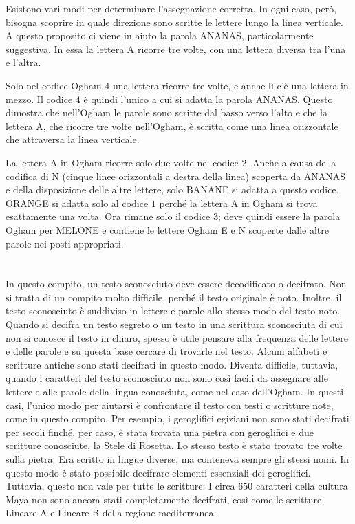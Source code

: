 {{Esistono vari modi per determinare l’assegnazione corretta. In ogni caso, però, bisogna scoprire in quale direzione sono scritte le lettere lungo la linea verticale. A questo proposito ci viene in aiuto la parola ANANAS, particolarmente suggestiva. In essa la lettera A ricorre tre volte, con una lettera diversa tra l’una e l’altra.

Solo nel codice Ogham $4$ una lettera ricorre tre volte, e anche lì c’è una lettera in mezzo. Il codice $4$ è quindi l’unico a cui si adatta la parola ANANAS. Questo dimostra che nell’Ogham le parole sono scritte dal basso verso l’alto e che la lettera A, che ricorre tre volte nell’Ogham, è scritta come una linea orizzontale che attraversa la linea verticale.

La lettera A in Ogham ricorre solo due volte nel codice $2$. Anche a causa della codifica di N (cinque linee orizzontali a destra della linea) scoperta da ANANAS e della disposizione delle altre lettere, solo BANANE si adatta a questo codice. ORANGE si adatta solo al codice $1$ perché la lettera A in Ogham si trova esattamente una volta. Ora rimane solo il codice $3$; deve quindi essere la parola Ogham per MELONE e contiene le lettere Ogham E e N scoperte dalle altre parole nei posti appropriati.



\section*{\BrochureItsInformatics}
In questo compito, un testo sconosciuto deve essere decodificato o decifrato.  Non si tratta di un compito molto difficile, perché il testo originale è noto. Inoltre, il testo sconosciuto è suddiviso in lettere e parole allo stesso modo del testo noto. Quando si decifra un testo segreto o un testo in una scrittura sconosciuta di cui non si conosce il testo in chiaro, spesso è utile pensare alla frequenza delle lettere e delle parole e su questa base cercare di trovarle nel testo. Alcuni alfabeti e scritture antiche sono stati decifrati in questo modo. Diventa difficile, tuttavia, quando i caratteri del testo sconosciuto non sono così facili da assegnare alle lettere e alle parole della lingua conosciuta, come nel caso dell’Ogham. In questi casi, l’unico modo per aiutarsi è confrontare il testo con testi o scritture note, come in questo compito. Per esempio, i geroglifici egiziani non sono stati decifrati per secoli finché, per caso, è stata trovata una pietra con geroglifici e due scritture conosciute, la Stele di Rosetta. Lo stesso testo è stato trovato tre volte sulla pietra. Era scritto in lingue diverse, ma conteneva sempre gli stessi nomi. In questo modo è stato possibile decifrare elementi essenziali dei geroglifici. Tuttavia, questo non vale per tutte le scritture: I circa $650$ caratteri della cultura Maya non sono ancora stati completamente decifrati, così come le scritture Lineare A e Lineare B della regione mediterranea.

}}
